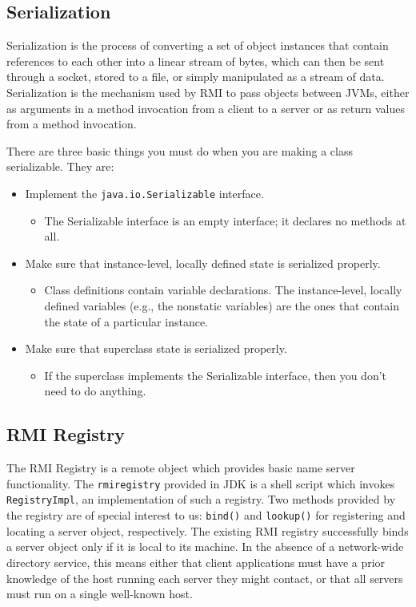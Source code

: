 \subsection{Serialization}
Serialization is the process of converting a set of object instances that contain references to each other into a linear stream of bytes, which can then be sent through a socket, stored to a file, or simply manipulated as a stream of data. Serialization is the mechanism used by RMI to pass objects between JVMs, either as arguments in a method invocation from a client to a server or as return values from a method invocation. \cite{JavaRMIOreillySerialization}

There are three basic things you must do when you are making a class serializable. They are:

\begin{itemize}
    \item Implement the \texttt{java.io.Serializable} interface.
    \begin{itemize}
        \item The Serializable interface is an empty interface; it declares no methods at all.
    \end{itemize}
    \item Make sure that instance-level, locally defined state is serialized properly.
    \begin{itemize}
        \item Class definitions contain variable declarations. The instance-level, locally defined variables (e.g., the nonstatic variables) are the ones that contain the state of a particular instance.
    \end{itemize}
    \item Make sure that superclass state is serialized properly.
    \begin{itemize}
        \item If the superclass implements the Serializable interface, then you don't need to do anything.
    \end{itemize}
\end{itemize}

\subsection{RMI Registry}

The RMI Registry is a remote object which provides basic name server functionality. The \texttt{rmiregistry} provided in JDK is a shell script which invokes \texttt{RegistryImpl}, an implementation of such a registry. Two methods provided by the registry are of special interest to us: \texttt{bind()} and \texttt{lookup()} for registering and locating a server object, respectively. The existing RMI registry successfully binds a server object only if it is local to its machine. In the absence of a network-wide directory service, this means either that client applications must have a prior knowledge of the host running each server they might contact, or that all servers must run on a single well-known host. \cite{NetworkComputingWithJavaApplets}